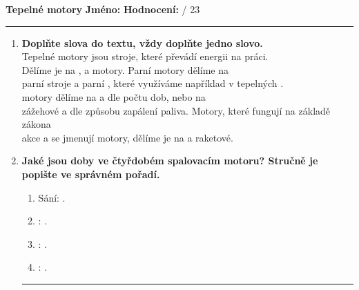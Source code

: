 \documentclass[../main.tex]{subfiles}
\begin{document}
\pagestyle{empty}

{\Large\textbf{Tepelné motory}}
\hfill
\textbf{Jméno:}
\tecky{5cm}
\hspace{0.25cm}
\textbf{Hodnocení:}
\tecky{0.5cm}
{/}
{23}
\vspace{0.25cm}
\hrule

\begin{enumerate}[label={\textbf{\arabic*.}}]
    \item \textbf{Doplňte slova do textu, vždy doplňte jedno slovo.}\vspace{0.25cm}\\ 
    {Tepelné motory jsou stroje, které převádí \cara{3cm} energii na \cara{4cm} práci. \\
    Dělíme je na \cara{3cm}, \cara{3cm} a \cara{3cm} motory. Parní motory dělíme na \\
    parní stroje a parní \cara{3cm}, které využíváme například v tepelných \cara{3cm}.\\
    \cara{3cm} motory dělíme na \cara{3cm} a \cara{3cm} dle počtu dob, nebo na \\
    zážehové a \cara{3cm} dle způsobu zapálení paliva. Motory, které fungují na základě zákona\\
    akce a \cara{3cm} se jmenují \cara{3cm} motory, dělíme je na \cara{3cm} a raketové.}
    \vspace{-0.5cm}
    \item \textbf{Jaké jsou doby ve čtyřdobém spalovacím motoru? Stručně je popište ve správném pořadí.}
    \begin{enumerate}[label={\arabic*.}]
        \item {Sání:}\hspace{1.75cm}\tecky{14cm} .
        \item \tecky{2cm}:\hspace{0.5cm}{Píst jede směrem nahoru, oba ventily jsou zavřeny. Tlak a teplota rostou} .
        \item \tecky{2cm}:\hspace{0.5cm}\tecky{14cm} .
        \item \tecky{2cm}:\hspace{0.5cm}\tecky{14cm} .
    \end{enumerate}
    \vspace{-0.5cm}
    \hrule
    \begin{minipage}{0.45\textwidth}
        \vspace{0.25cm}

\end{minipage}
\end{enumerate}
\end{document}
